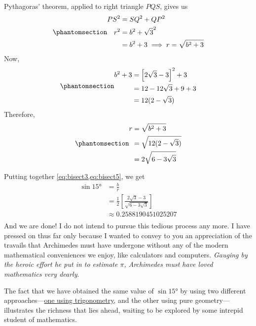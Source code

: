 \documentclass[
  a4paper,
]{article}
\begin{document}
Pythagoras' theorem, applied to right triangle \(PQS\), gives us
\begin{equation}\phantomsection\label{eq:bisect4}{
\begin{aligned}
PS^2 &= SQ^2 + QP^2\\
r^2 &= b^2 + \sqrt{3}^2\\
&= b^2 +3 \implies r = \sqrt{b^2 + 3}\\
\end{aligned}
}\end{equation} Now, \begin{equation}\phantomsection\label{eq:bisect5}{
\begin{aligned}
b^2 + 3 &= \left[{2\sqrt{3} - 3}\right]^2 + 3\\
&= {12 - 12\sqrt{3} + 9 + 3} \\
&= 12(2 - \sqrt{3})
\end{aligned}
}\end{equation} Therefore,
\begin{equation}\phantomsection\label{eq:bisect6}{
\begin{aligned}
r &= \sqrt{b^2 + 3}\\
&= \sqrt{12(2 - \sqrt{3})}\\
&=2\sqrt{6 - 3\sqrt{3}}\\
\end{aligned}
}\end{equation}

Putting together \cref{eq:bisect3,eq:bisect5}, we get \[
\begin{aligned}
\sin 15° &= \frac{b}{r}\\
&= \frac{1}{2}\left[\frac{2\sqrt{3} - 3}{\sqrt{6 - 3\sqrt{3}}}\right]\\[1em]
&\approx 0.2588190451025207\\
\end{aligned}
\] And we are done! I do not intend to pursue this tedious process any
more. I have pressed on thus far only because I wanted to convey to you
an appreciation of the travails that Archimedes must have undergone
without any of the modern mathematical conveniences we enjoy, like
calculators and computers. \emph{Gauging by the heroic effort he put in
to estimate \(\pi\), Archimedes must have loved mathematics very
dearly}.

The fact that we have obtained the same value of \(\sin 15°\) by using
two different approaches---\hyperref[the-half-angle-formulae]{one using
trigonometry}, and the other using pure geometry--- illustrates the
richness that lies ahead, waiting to be explored by some intrepid
student of mathematics.
\end{document}
